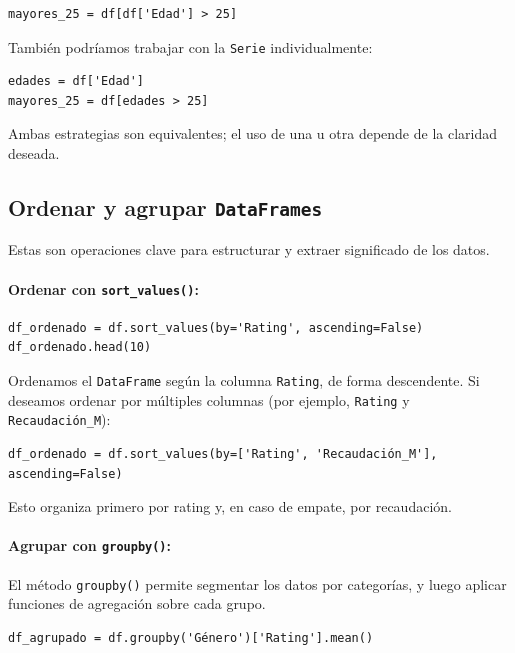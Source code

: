 \documentclass{article}
\theoremstyle{nonumberplain}
\begin{document}
\begin{verbatim}
mayores_25 = df[df['Edad'] > 25]
\end{verbatim}

También podríamos trabajar con la \texttt{Serie} individualmente:

\begin{verbatim}
edades = df['Edad']
mayores_25 = df[edades > 25]
\end{verbatim}

Ambas estrategias son equivalentes; el uso de una u otra depende de la claridad deseada.

\subsection*{Ordenar y agrupar \texttt{DataFrames}}

Estas son operaciones clave para estructurar y extraer significado de los datos.

\paragraph{Ordenar con \texttt{sort\_values()}:}

\begin{verbatim}
df_ordenado = df.sort_values(by='Rating', ascending=False)
df_ordenado.head(10)
\end{verbatim}

Ordenamos el \texttt{DataFrame} según la columna \texttt{Rating}, de forma descendente. Si deseamos ordenar por múltiples columnas (por ejemplo, \texttt{Rating} y \texttt{Recaudación\_M}):

\begin{verbatim}
df_ordenado = df.sort_values(by=['Rating', 'Recaudación_M'], ascending=False)
\end{verbatim}

Esto organiza primero por rating y, en caso de empate, por recaudación.

\paragraph{Agrupar con \texttt{groupby()}:}

El método \texttt{groupby()} permite segmentar los datos por categorías, y luego aplicar funciones de agregación sobre cada grupo.

\begin{verbatim}
df_agrupado = df.groupby('Género')['Rating'].mean()
\end{verbatim}
\end{document}

